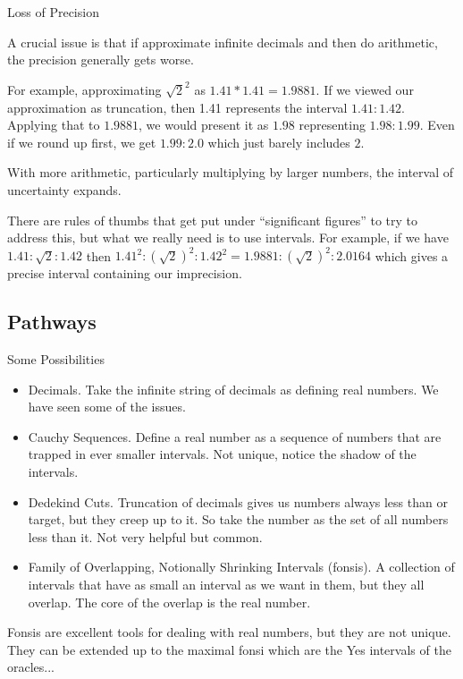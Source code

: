 \documentclass{beamer}
\begin{document}
\begin{frame}{Loss of Precision}

    A crucial issue is that if approximate infinite decimals and then do arithmetic, the precision generally gets worse. 

    For example, approximating $\sqrt{2}^2$ as $1.41*1.41 = 1.9881$. If we viewed our approximation as truncation, then 1.41 represents the interval $1.41:1.42$.  Applying that to $1.9881$, we would present it as $1.98$ representing $1.98:1.99$. Even if we round up first, we get $1.99:2.0$ which just barely includes $2$.

    With more arithmetic, particularly multiplying by larger numbers, the interval of uncertainty expands. 

    There are rules of thumbs that get put under ``significant figures'' to try to address this, but what we really need is to use intervals.  For example, if we have $1.41:\sqrt{2}:1.42$ then $1.41^2 : (\sqrt{2})^2 : 1.42^2 = 1.9881 : (\sqrt{2})^2 : 2.0164$ which gives a precise interval containing our imprecision. 

    
\end{frame}

\subsection{Pathways}

\begin{frame}{Some Possibilities}
    \begin{itemize}
        \item Decimals. Take the infinite string of decimals as defining real numbers. We have seen some of the issues. 
        \item Cauchy Sequences. Define a real number as a sequence of numbers that are trapped in ever smaller intervals. Not unique, notice the shadow of the intervals.   
        \item Dedekind Cuts. Truncation of decimals gives us numbers always less than or target, but they creep up to it. So take the number as the set of all numbers less than it. Not very helpful but common.
        \item Family of Overlapping, Notionally Shrinking Intervals (fonsis). A collection of intervals that have as small an interval as we want in them, but they all overlap. The core of the overlap is the real number. 
    \end{itemize}

Fonsis are excellent tools for dealing with real numbers, but they are not unique. They can be extended up to the maximal fonsi which are the Yes intervals of the oracles...
    
\end{frame}
\end{document}
